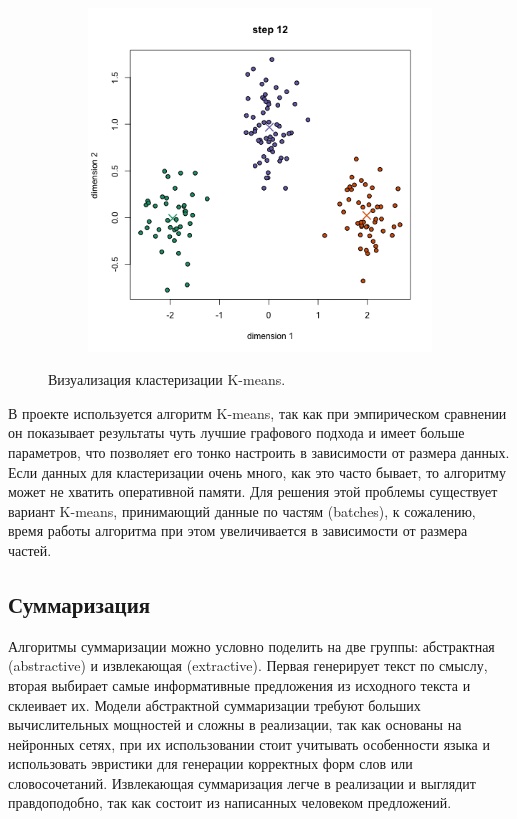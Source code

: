 \documentclass[a4paper, 14pt]{extarticle}
\begin{document}
\begin{figure}[h]
\begin{subfigure}[b]{0.3\textwidth}
		\caption{}
	\end{subfigure}
	~ 
	\begin{subfigure}[b]{0.3\textwidth}
		\includegraphics[width=\textwidth]{k_5}
		\caption{}
	\end{subfigure}
	\caption{Визуализация кластеризации K-means.}
	\label{km}
\end{figure}

В проекте используется алгоритм K-means, так как при эмпирическом сравнении он показывает результаты чуть лучшие графового подхода и имеет больше параметров, что позволяет его тонко настроить в зависимости от размера данных. Если данных для кластеризации очень много, как это часто бывает, то алгоритму может не хватить оперативной памяти. Для решения этой проблемы существует вариант K-means, принимающий данные по частям (batches), к сожалению, время работы алгоритма при этом увеличивается в зависимости от размера частей.



\subsection{Суммаризация}
Алгоритмы суммаризации можно условно поделить на две группы: абстрактная (abstractive) и извлекающая (extractive). Первая генерирует текст по смыслу, вторая выбирает самые информативные предложения из исходного текста и склеивает их. Модели абстрактной суммаризации требуют больших вычислительных мощностей и сложны в реализации, так как основаны на нейронных сетях, при их использовании стоит учитывать особенности языка и использовать эвристики для генерации корректных форм слов или словосочетаний. Извлекающая суммаризация легче в реализации и выглядит правдоподобно, так как состоит из написанных человеком предложений.
\end{document}
